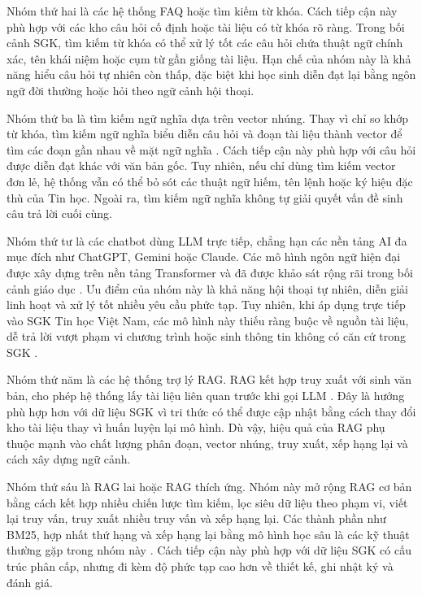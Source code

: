 \documentclass[../DoAn.tex]{subfiles}
\begin{document}
Nhóm thứ hai là các hệ thống FAQ hoặc tìm kiếm từ khóa. Cách tiếp cận này phù hợp với các kho câu hỏi cố định hoặc tài liệu có từ khóa rõ ràng. Trong bối cảnh SGK, tìm kiếm từ khóa có thể xử lý tốt các câu hỏi chứa thuật ngữ chính xác, tên khái niệm hoặc cụm từ gần giống tài liệu. Hạn chế của nhóm này là khả năng hiểu câu hỏi tự nhiên còn thấp, đặc biệt khi học sinh diễn đạt lại bằng ngôn ngữ đời thường hoặc hỏi theo ngữ cảnh hội thoại.

Nhóm thứ ba là tìm kiếm ngữ nghĩa dựa trên vector nhúng. Thay vì chỉ so khớp từ khóa, tìm kiếm ngữ nghĩa biểu diễn câu hỏi và đoạn tài liệu thành vector để tìm các đoạn gần nhau về mặt ngữ nghĩa \cite{reimers2019sbert,karpukhin2020dpr}. Cách tiếp cận này phù hợp với câu hỏi được diễn đạt khác với văn bản gốc. Tuy nhiên, nếu chỉ dùng tìm kiếm vector đơn lẻ, hệ thống vẫn có thể bỏ sót các thuật ngữ hiếm, tên lệnh hoặc ký hiệu đặc thù của Tin học. Ngoài ra, tìm kiếm ngữ nghĩa không tự giải quyết vấn đề sinh câu trả lời cuối cùng.

Nhóm thứ tư là các chatbot dùng LLM trực tiếp, chẳng hạn các nền tảng AI đa mục đích như ChatGPT, Gemini hoặc Claude. Các mô hình ngôn ngữ hiện đại được xây dựng trên nền tảng Transformer và đã được khảo sát rộng rãi trong bối cảnh giáo dục \cite{vaswani2017attention,wang2024llmeducation,yan2024llm_edu}. Ưu điểm của nhóm này là khả năng hội thoại tự nhiên, diễn giải linh hoạt và xử lý tốt nhiều yêu cầu phức tạp. Tuy nhiên, khi áp dụng trực tiếp vào SGK Tin học Việt Nam, các mô hình này thiếu ràng buộc về nguồn tài liệu, dễ trả lời vượt phạm vi chương trình hoặc sinh thông tin không có căn cứ trong SGK \cite{ji2023hallucination}.

Nhóm thứ năm là các hệ thống trợ lý RAG. RAG kết hợp truy xuất với sinh văn bản, cho phép hệ thống lấy tài liệu liên quan trước khi gọi LLM \cite{lewis2020rag}. Đây là hướng phù hợp hơn với dữ liệu SGK vì tri thức có thể được cập nhật bằng cách thay đổi kho tài liệu thay vì huấn luyện lại mô hình. Dù vậy, hiệu quả của RAG phụ thuộc mạnh vào chất lượng phân đoạn, vector nhúng, truy xuất, xếp hạng lại và cách xây dựng ngữ cảnh.

Nhóm thứ sáu là RAG lai hoặc RAG thích ứng. Nhóm này mở rộng RAG cơ bản bằng cách kết hợp nhiều chiến lược tìm kiếm, lọc siêu dữ liệu theo phạm vi, viết lại truy vấn, truy xuất nhiều truy vấn và xếp hạng lại. Các thành phần như BM25, hợp nhất thứ hạng và xếp hạng lại bằng mô hình học sâu là các kỹ thuật thường gặp trong nhóm này \cite{robertson2009bm25,cormack2009rrf,nogueira2019passage}. Cách tiếp cận này phù hợp với dữ liệu SGK có cấu trúc phân cấp, nhưng đi kèm độ phức tạp cao hơn về thiết kế, ghi nhật ký và đánh giá.
\end{document}
